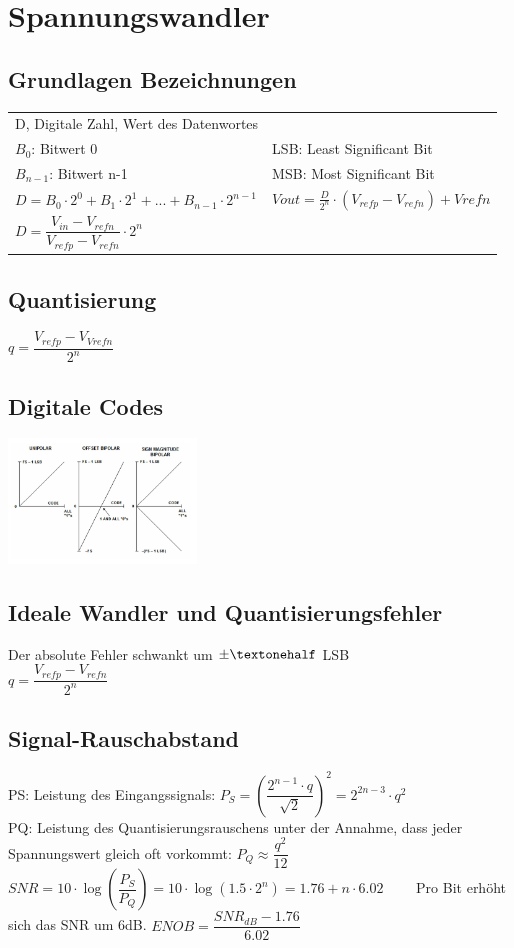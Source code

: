 \section{Spannungswandler}

\subsection{Grundlagen Bezeichnungen}
\begin{tabular}{p{250pt} p{250pt}}
D, Digitale Zahl, Wert des Datenwortes& \\
$B_0$: Bitwert 0 & LSB: Least Significant Bit\\
$B_{n-1}$: Bitwert n-1 & MSB: Most Significant Bit\\
$D = B_0\cdot 2^0 + B_1\cdot 2^1+...+B_{n-1}\cdot 2^{n-1}$&
$Vout = \frac{D}{2^n}\cdot (V_{refp}-V_{refn})+V{refn}$\\
$D = \dfrac{V_{in}-V_{refn}}{V_{refp}-V_{refn}}\cdot 2^n$
\end{tabular}

\subsection{Quantisierung}
$q = \dfrac{V_{refp}-V_{Vrefn} }{2^n}$\\

\subsection{Digitale Codes}
\includegraphics[width = 5cm]{images/spgwandler/01_digitalecodes}

\subsection{Ideale Wandler und Quantisierungsfehler}
Der absolute Fehler schwankt um $\pm \textonehalf$ LSB\\
$q = \dfrac{V_{refp} - V_{refn}}{2^n}$

\subsection{Signal-Rauschabstand}
PS: Leistung des Eingangssignals: $P_S = \left(\dfrac{2^{n-1}\cdot q}{\sqrt{2}}\right)^2 = 2^{2n-3}\cdot q^2$\\
PQ: Leistung des Quantisierungsrauschens unter der Annahme, dass jeder Spannungswert gleich oft vorkommt: $P_Q \approx \dfrac{q^2}{12}$\\
$SNR = 10\cdot \log(\dfrac{P_S}{P_Q}) = 10\cdot \log(1.5\cdot 2^n) = 1.76 +n\cdot 6.02 \qquad$ Pro Bit erhöht sich das SNR um 6dB. $ENOB = \dfrac{SNR_{dB}- 1.76}{6.02}$
